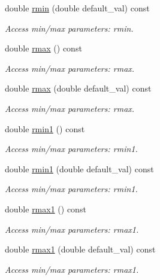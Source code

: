 \begin{DoxyCompactItemize}
double \hyperlink{struct_d_d4hep_1_1_x_m_l_1_1_dimension_a4ffbddca3b9e93e915eab90ec9a8c497}{rmin} (double default\+\_\+val) const
\begin{DoxyCompactList}\small\item\em Access min/max parameters\+: rmin. \end{DoxyCompactList}\item 
double \hyperlink{struct_d_d4hep_1_1_x_m_l_1_1_dimension_a83b3db7828f1e58943eb0ddabc9e9459}{rmax} () const
\begin{DoxyCompactList}\small\item\em Access min/max parameters\+: rmax. \end{DoxyCompactList}\item 
double \hyperlink{struct_d_d4hep_1_1_x_m_l_1_1_dimension_ac458880df7de7d4a9876b1c20f398eb8}{rmax} (double default\+\_\+val) const
\begin{DoxyCompactList}\small\item\em Access min/max parameters\+: rmax. \end{DoxyCompactList}\item 
double \hyperlink{struct_d_d4hep_1_1_x_m_l_1_1_dimension_ad3449140dd8723be6c9895ae03ccfe79}{rmin1} () const
\begin{DoxyCompactList}\small\item\em Access min/max parameters\+: rmin1. \end{DoxyCompactList}\item 
double \hyperlink{struct_d_d4hep_1_1_x_m_l_1_1_dimension_a5f32fce071d6e845d6df8ff8b3235542}{rmin1} (double default\+\_\+val) const
\begin{DoxyCompactList}\small\item\em Access min/max parameters\+: rmin1. \end{DoxyCompactList}\item 
double \hyperlink{struct_d_d4hep_1_1_x_m_l_1_1_dimension_ada815f20fb0045d499b91e646ceca415}{rmax1} () const
\begin{DoxyCompactList}\small\item\em Access min/max parameters\+: rmax1. \end{DoxyCompactList}\item 
double \hyperlink{struct_d_d4hep_1_1_x_m_l_1_1_dimension_a7cc26c67a212d9aeaaf0b1d10531c0c7}{rmax1} (double default\+\_\+val) const
\begin{DoxyCompactList}\small\item\em Access min/max parameters\+: rmax1. \end{DoxyCompactList}\item 

\end{DoxyCompactItemize}

